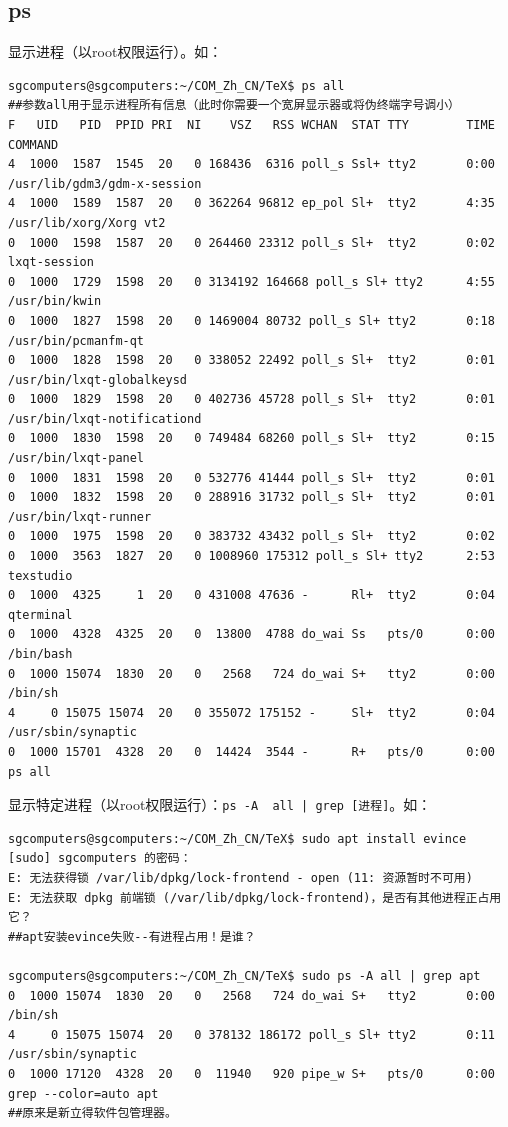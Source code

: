 \subsection{ps}
显示进程（以root权限运行）。如：
\begin{verbatim}
sgcomputers@sgcomputers:~/COM_Zh_CN/TeX$ ps all
##参数all用于显示进程所有信息（此时你需要一个宽屏显示器或将伪终端字号调小）
F   UID   PID  PPID PRI  NI    VSZ   RSS WCHAN  STAT TTY        TIME COMMAND
4  1000  1587  1545  20   0 168436  6316 poll_s Ssl+ tty2       0:00 /usr/lib/gdm3/gdm-x-session 
4  1000  1589  1587  20   0 362264 96812 ep_pol Sl+  tty2       4:35 /usr/lib/xorg/Xorg vt2 
0  1000  1598  1587  20   0 264460 23312 poll_s Sl+  tty2       0:02 lxqt-session
0  1000  1729  1598  20   0 3134192 164668 poll_s Sl+ tty2      4:55 /usr/bin/kwin
0  1000  1827  1598  20   0 1469004 80732 poll_s Sl+ tty2       0:18 /usr/bin/pcmanfm-qt 
0  1000  1828  1598  20   0 338052 22492 poll_s Sl+  tty2       0:01 /usr/bin/lxqt-globalkeysd
0  1000  1829  1598  20   0 402736 45728 poll_s Sl+  tty2       0:01 /usr/bin/lxqt-notificationd
0  1000  1830  1598  20   0 749484 68260 poll_s Sl+  tty2       0:15 /usr/bin/lxqt-panel
0  1000  1831  1598  20   0 532776 41444 poll_s Sl+  tty2       0:01 
0  1000  1832  1598  20   0 288916 31732 poll_s Sl+  tty2       0:01 /usr/bin/lxqt-runner
0  1000  1975  1598  20   0 383732 43432 poll_s Sl+  tty2       0:02 
0  1000  3563  1827  20   0 1008960 175312 poll_s Sl+ tty2      2:53 texstudio
0  1000  4325     1  20   0 431008 47636 -      Rl+  tty2       0:04 qterminal
0  1000  4328  4325  20   0  13800  4788 do_wai Ss   pts/0      0:00 /bin/bash
0  1000 15074  1830  20   0   2568   724 do_wai S+   tty2       0:00 /bin/sh 
4     0 15075 15074  20   0 355072 175152 -     Sl+  tty2       0:04 /usr/sbin/synaptic
0  1000 15701  4328  20   0  14424  3544 -      R+   pts/0      0:00 ps all
\end{verbatim} \par
显示特定进程（以root权限运行）：\verb/ps -A  all | grep [进程]/。如：
\begin{verbatim}
sgcomputers@sgcomputers:~/COM_Zh_CN/TeX$ sudo apt install evince
[sudo] sgcomputers 的密码： 
E: 无法获得锁 /var/lib/dpkg/lock-frontend - open (11: 资源暂时不可用)
E: 无法获取 dpkg 前端锁 (/var/lib/dpkg/lock-frontend)，是否有其他进程正占用它？
##apt安装evince失败--有进程占用！是谁？

sgcomputers@sgcomputers:~/COM_Zh_CN/TeX$ sudo ps -A all | grep apt
0  1000 15074  1830  20   0   2568   724 do_wai S+   tty2       0:00 /bin/sh 
4     0 15075 15074  20   0 378132 186172 poll_s Sl+ tty2       0:11 /usr/sbin/synaptic
0  1000 17120  4328  20   0  11940   920 pipe_w S+   pts/0      0:00 grep --color=auto apt
##原来是新立得软件包管理器。
\end{verbatim}
